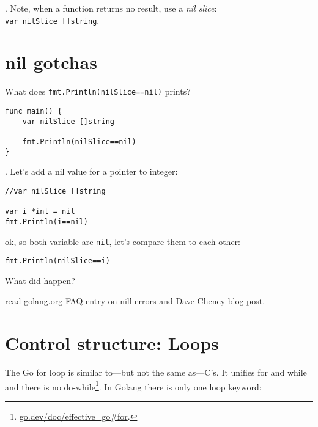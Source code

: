 \documentclass[11pt, letterpaper]{article}
\begin{document}
. Note, when a function returns no result, use a \emph{nil slice}:\\ \texttt{var nilSlice []string}.

\section{nil gotchas}

What does \texttt{fmt.Println(nilSlice==nil)} prints?

\begin{verbatim}
func main() {
	var nilSlice []string

	fmt.Println(nilSlice==nil)
}
\end{verbatim}

. Let's add a nil value for a pointer to integer:

\begin{verbatim}
//var nilSlice []string

var i *int = nil
fmt.Println(i==nil)
\end{verbatim}

ok, so both variable are \texttt{nil}, let's compare them to each other:

\begin{verbatim}
fmt.Println(nilSlice==i)
\end{verbatim}

\bigskip
What did happen?

\bigskip
[Homework] read \href{https://golang.org/doc/faq#nil_error}{golang.org {\small FAQ} entry on nill errors} and \href{https://dave.cheney.net/2017/08/09/typed-nils-in-go-2}{Dave Cheney blog post}.







\section{Control structure: Loops}

The Go for loop is similar to—but not the same as—C's. It unifies for and while and there is no do-while\footnote{\href{https://go.dev/doc/effective\_go\#for}{go.dev/doc/effective\_go\#for}.}. In Golang there is only one loop keyword:
\end{document}
